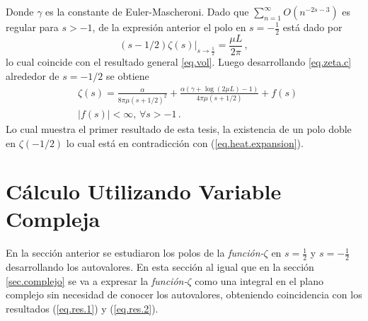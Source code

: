 Donde $\gamma$ es la constante de Euler-Mascheroni.
Dado que $\sum _{n=1} ^{\infty} O \left( n ^{-2s-3} \right)$ es regular para $s > -1$, de la expresión anterior el polo en $s= - \frac{1}{2}$ está dado por
\begin{equation}\label{eq.res.2}
    ( s-1/2 ) \zeta  (s) | _{s \rightarrow \frac{1}{2}} = 
    \frac{\mu L }{2 \pi}
    	\, ,
\end{equation}
lo cual coincide con el resultado general \ref{eq.vol}. Luego desarrollando \ref{eq.zeta.c} alrededor de $s=-1/2$ se obtiene
\begin{align}\label{eq.res.1}
    &\zeta  (s) =  \frac{\alpha}{8  \pi \mu (s+1/2)^2} +
    \frac{ \alpha ( \gamma  +  \log (2\mu L ) -1 ) }{4  \pi \mu (s+1/2) }  + 
	f (s) \\
	&| f(s) | < \infty , \, \forall s > -1
    	\, .
\end{align}
Lo cual muestra el primer resultado de esta tesis, la existencia de un polo doble en $\zeta(-1/2)$ lo cual está en contradicción con (\ref{eq.heat.expansion}).

\section{Cálculo Utilizando Variable Compleja}\label{seq.2.com}


En la sección anterior se estudiaron los polos de la {\it función-$\zeta$} en $s=\frac{1}{2}$ y $s=-\frac{1}{2}$ desarrollando los autovalores.
En esta sección al igual que en la sección \ref{sec.complejo} se va a expresar la {\it función-$\zeta $} como una integral en el plano complejo sin necesidad de conocer los autovalores, obteniendo coincidencia con los resultados (\ref{eq.res.1}) y (\ref{eq.res.2}).

